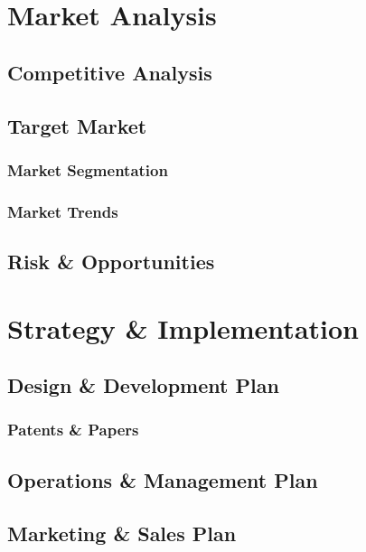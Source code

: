 \documentclass[titlepage]{article}
\begin{document}
\section{Market Analysis}
\subsection{Competitive Analysis}
\subsection{Target Market}
\subsubsection{Market Segmentation}
\subsubsection{Market Trends}
\subsection{Risk \& Opportunities}


\section{Strategy \& Implementation}
\subsection{Design \& Development Plan}
\subsubsection{Patents \& Papers}
\subsection{Operations \& Management Plan}
\subsection{Marketing \& Sales Plan}


\end{document}

